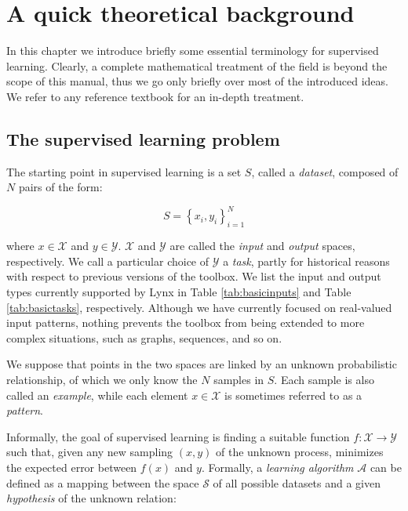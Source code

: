 \chapter{A quick theoretical background}
\label{chap:theoreticalbackground}

In this chapter we introduce briefly some essential terminology for supervised learning. Clearly, a complete mathematical treatment of the field is beyond the scope of this manual, thus we go only briefly over most of the introduced ideas. We refer to any reference textbook for an in-depth treatment.\cite{alpaydin2004introduction,Friedman2009,Mohri2012}

\section{The supervised learning problem}

The starting point in supervised learning is a set $S$, called a \textit{dataset}, composed of $N$ pairs of the form:

\begin{equation}
S = \left\{ x_i, y_i \right\}_{i=1}^N
\label{eq:dataset}
\end{equation}

\noindent where $x \in \mathcal{X}$ and $y \in \mathcal{Y}$. $\mathcal{X}$ and $\mathcal{Y}$ are called the \textit{input} and \textit{output} spaces, respectively.  We call a particular choice of $\mathcal{Y}$ a \textit{task}, partly for historical reasons with respect to previous versions of the toolbox. We list the input and output types currently supported by Lynx in Table \ref{tab:basicinputs} and Table \ref{tab:basictasks}, respectively. Although we have currently focused on real-valued input patterns, nothing prevents the toolbox from being extended to more complex situations, such as graphs, sequences, and so on.

We suppose that points in the two spaces are linked by an unknown probabilistic relationship, of which we only know the $N$ samples in $S$. Each sample is also called an \textit{example}, while each element $x \in \mathcal{X}$ is sometimes referred to as a \textit{pattern}.

Informally, the goal of supervised learning is finding a suitable function $f: \mathcal{X} \rightarrow \mathcal{Y}$ such that, given any new sampling $(x, y)$ of the unknown process, minimizes the expected error between $f(x)$ and $y$. Formally, a \textit{learning algorithm} $\mathcal{A}$ can be defined as a mapping between the space $\mathcal{S}$ of all possible datasets and a given \textit{hypothesis} of the unknown relation:

